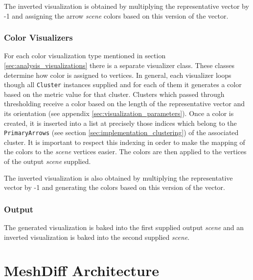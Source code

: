 The inverted visualization is obtained by multiplying the representative vector by -1 and assigning the arrow {\it scene} colors based on this version of the vector.

\subsubsection{Color Visualizers}

For each color visualization type mentioned in section \ref{sec:analysis_visualizations} there is a separate visualizer class. These classes determine how color is assigned to vertices. In general, each visualizer loops though all \verb+Cluster+ instances supplied and for each of them it generates a color based on the metric value for that cluster. Clusters which passed through thresholding receive a color based on the length of the representative vector and its orientation (see appendix \ref{sec:visualization_parameters}). Once a color is created, it is inserted into a list at precisely those indices which belong to the \verb+PrimaryArrows+ (see section \ref{sec:implementation_clustering}) of the associated cluster. It is important to respect this indexing in order to make the mapping of the colors to the {\it scene} vertices easier. The colors are then applied to the vertices of the output {\it scene} supplied\footnotemark.

The inverted visualization is also obtained by multiplying the representative vector by -1 and generating the colors based on this version of the vector.


\subsubsection{Output}

The generated visualization is baked into the first supplied output {\it scene} and an inverted visualization is baked into the second supplied {\it scene}.
\section{MeshDiff Architecture}

